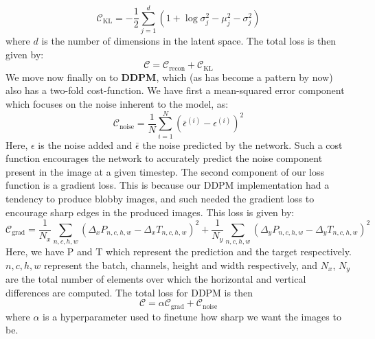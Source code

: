 \documentclass{article}
\begin{document}
\begin{equation}
    \mathcal{C}_{\text{KL}} = - \frac{1}{2} \sum_{j=1}^d \left(1 + \log \sigma_j^2 - \mu_j^2 - \sigma_j^2 \right)
\end{equation}
where $d$ is the number of dimensions in the latent space.
\newline
The total loss is then given by:
\begin{equation}
    \mathcal{C} = \mathcal{C}_{\text{recon}} + \mathcal{C}_{\text{KL}}
\end{equation}
\newline
We move now finally on to \textbf{DDPM}, which (as has become a pattern by now) also has a two-fold cost-function. We have first a mean-squared error component which focuses on the noise inherent to the model, as:
\begin{equation}
    \mathcal{C}_{\text{noise}} = \frac{1}{N} \sum_{i=1}^N \left( \bar \epsilon^{(i)} - \epsilon^{(i)} \right)^2
\end{equation}
Here, $\epsilon$ is the noise added and $\bar \epsilon$ the noise predicted by the network. Such a cost function encourages the network to accurately predict the noise component present in the image at a given timestep.
\newline
The second component of our loss function is a gradient loss. This is because our DDPM implementation had a tendency to produce blobby images, and such needed the gradient loss to encourage sharp edges in the produced images.
\newline
This loss is given by:
\begin{equation}
    \mathcal{C}_{\text{grad}} = \frac{1}{N_x} \sum_{n,c,h,w} \left( \Delta_x P_{n,c,h,w} - \Delta_x T_{n,c,h,w} \right)^2 + \frac{1}{N_y} \sum_{n,c,h,w} \left( \Delta_y P_{n,c,h,w} - \Delta_y T_{n,c,h,w} \right)^2
\end{equation}
Here, we have P and T which represent the prediction and the target respectively. $n, c, h, w$ represent the batch, channels, height and width respectively, and $N_x$, $N_y$ are the total number of elements over which the horizontal and vertical differences are computed.
\newline
The total loss for DDPM is then
\begin{equation}
    \mathcal{C} = \alpha\mathcal{C}_{\text{grad}} + \mathcal{C}_{\text{noise}}
\end{equation}
where $\alpha$ is a hyperparameter used to finetune how sharp we want the images to be.
\end{document}
